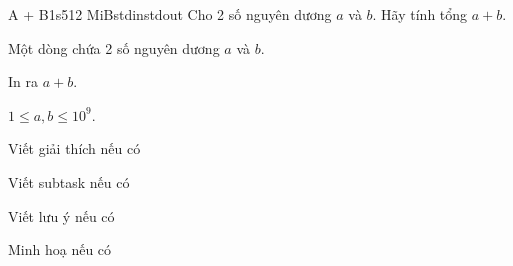 \begin{problem}{A + B}{1s}{512 MiB}{stdin}{stdout}
Cho 2 số nguyên dương $a$ và $b$. Hãy tính tổng $a + b$.

\InputFile
Một dòng chứa 2 số nguyên dương $a$ và $b$.

\OutputFile
In ra $a + b$.

\Constraints
$1 \le a, b \le 10^9$.

\Example
\begin{example}
%
%
\end{example}

\begin{examplewide}
%
\end{examplewide}

\begin{examplewide}
%
\end{examplewide}

\begin{examplethree}
%
%
\end{examplethree}

\Explanations

Viết giải thích nếu có

\Scoring

Viết subtask nếu có

\Notes

Viết lưu ý nếu có

\Illustration

Minh hoạ nếu có
\end{problem}